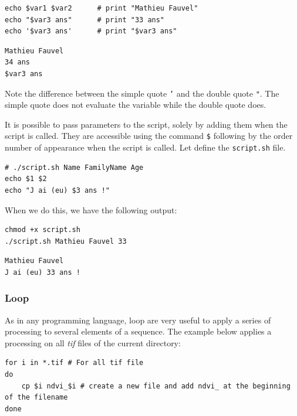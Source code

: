 \documentclass[a4paper,11pt,DIV=18]{scrartcl}
\begin{document}
\begin{verbatim}
echo $var1 $var2      # print "Mathieu Fauvel"
echo "$var3 ans"      # print "33 ans"
echo '$var3 ans'      # print "$var3 ans"
\end{verbatim}

\begin{verbatim}
Mathieu Fauvel
34 ans
$var3 ans
\end{verbatim}

Note the  difference between the simple  quote \texttt{'} and the  double quote
\texttt{"}. The  simple quote does not  evaluate the variable while  the double
quote does.

It is possible to pass parameters to the script, solely by adding them
when the  script is called.  They are  accessible using the  command \texttt{\$}
following by the order number of appearance when the script is
called. Let define the \texttt{script.sh} file.

\begin{verbatim}
# ./script.sh Name FamilyName Age
echo $1 $2
echo "J ai (eu) $3 ans !"
\end{verbatim}

When we do this, we have the following output:

\begin{verbatim}
chmod +x script.sh
./script.sh Mathieu Fauvel 33
\end{verbatim}

\begin{verbatim}
Mathieu Fauvel
J ai (eu) 33 ans !
\end{verbatim}

\subsubsection{Loop}
\label{sec:org2549815}
As in any programming language, loop are very useful to apply a series
of processing  to several  elements of a  sequence. The  example below
applies a processing on all \emph{tif} files of the current directory:

\begin{verbatim}
for i in *.tif # For all tif file
do
    cp $i ndvi_$i # create a new file and add ndvi_ at the beginning of the filename
done
\end{verbatim}
\end{document}
